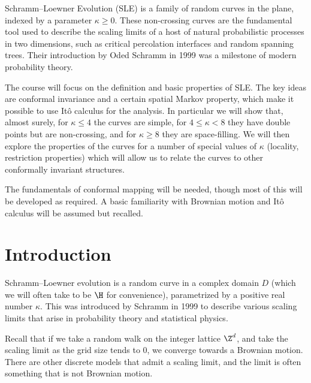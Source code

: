 \documentclass[a4paper]{article}
\begin{document}
\maketitle
{\small
\setlength{\parindent}{0em}
\setlength{\parskip}{1em}
Schramm--Loewner Evolution (SLE) is a family of random curves in the plane, indexed by a parameter $\kappa \geq 0$. These non-crossing curves are the fundamental tool used to describe the scaling limits of a host of natural probabilistic processes in two dimensions, such as critical percolation interfaces and random spanning trees. Their introduction by Oded Schramm in 1999 was a milestone of modern probability theory.

The course will focus on the definition and basic properties of SLE. The key ideas are conformal invariance and a certain spatial Markov property, which make it possible to use It\^o calculus for the analysis. In particular we will show that, almost surely, for $\kappa \leq 4$ the curves are simple, for $4 \leq \kappa < 8$ they have double points but are non-crossing, and for $\kappa \geq 8$ they are space-filling. We will then explore the properties of the curves for a number of special values of $\kappa$ (locality, restriction properties) which will allow us to relate the curves to other conformally invariant structures.

The fundamentals of conformal mapping will be needed, though most of this will be developed as required. A basic familiarity with Brownian motion and It\^o calculus will be assumed but recalled.
}
\tableofcontents

\setcounter{section}{-1}
\section{Introduction}
Schramm--Loewner evolution is a random curve in a complex domain $D$ (which we will often take to be $\H$ for convenience), parametrized by a positive real number $\kappa$. This was introduced by Schramm in 1999 to describe various scaling limits that arise in probability theory and statistical physics.

Recall that if we take a random walk on the integer lattice $\Z^d$, and take the scaling limit as the grid size tends to $0$, we converge towards a Brownian motion. There are other discrete models that admit a scaling limit, and the limit is often something that is not Brownian motion.
\end{document}
